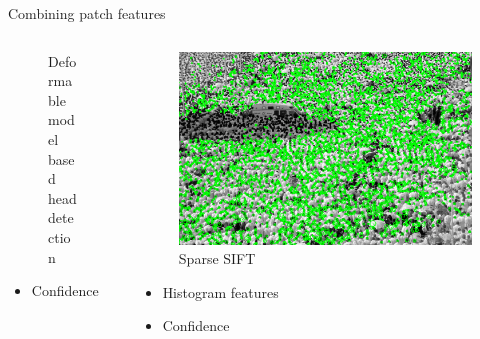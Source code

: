 \documentclass[11pt)]{beamer}
\begin{document}
\begin{frame}{Combining patch features}
\begin{columns}[t]
\begin{column}{.33\textwidth}
\begin{figure}[ht]
			\caption{Deformable model based head detection}
		\end{figure}
		\begin{itemize}
			\item Confidence
		\end{itemize}
	\end{column}
	\begin{column}{.33\textwidth}
		\begin{figure}[ht]
			\centering
			\includegraphics[width=\textwidth]{sift}
			\caption{Sparse SIFT}
		\end{figure}
		\begin{itemize}
			\item Histogram features
			\item Confidence
		\end{itemize}
	\end{column}
\end{columns}
\end{frame}
\end{document}
